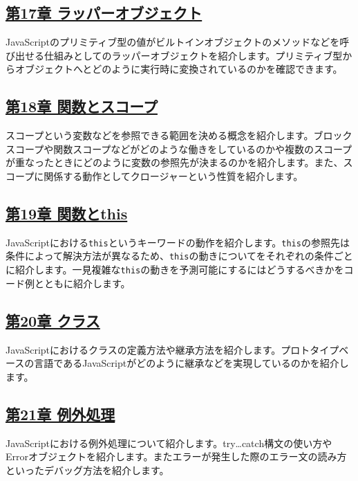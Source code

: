 \subsection*{\hyperlink{wrapper-object}{第17章 ラッパーオブジェクト}}

JavaScriptのプリミティブ型の値がビルトインオブジェクトのメソッドなどを呼び出せる仕組みとしてのラッパーオブジェクトを紹介します。プリミティブ型からオブジェクトへとどのように実行時に変換されているのかを確認できます。

\subsection*{\hyperlink{function-and-scope}{第18章 関数とスコープ}}

スコープという変数などを参照できる範囲を決める概念を紹介します。ブロックスコープや関数スコープなどがどのような働きをしているのかや複数のスコープが重なったときにどのように変数の参照先が決まるのかを紹介します。また、スコープに関係する動作としてクロージャーという性質を紹介します。

\subsection*{\hyperlink{function-this}{第19章 関数とthis}}

JavaScriptにおける\texttt{this}というキーワードの動作を紹介します。\texttt{this}の参照先は条件によって解決方法が異なるため、\texttt{this}の動きについてをそれぞれの条件ごとに紹介します。一見複雑な\texttt{this}の動きを予測可能にするにはどうするべきかをコード例とともに紹介します。

\subsection*{\hyperlink{class}{第20章 クラス}}

JavaScriptにおけるクラスの定義方法や継承方法を紹介します。プロトタイプベースの言語であるJavaScriptがどのように継承などを実現しているのかを紹介します。

\subsection*{\hyperlink{error-handling}{第21章 例外処理}}

JavaScriptにおける例外処理について紹介します。try\ldots{}catch構文の使い方やErrorオブジェクトを紹介します。またエラーが発生した際のエラー文の読み方といったデバッグ方法を紹介します。

